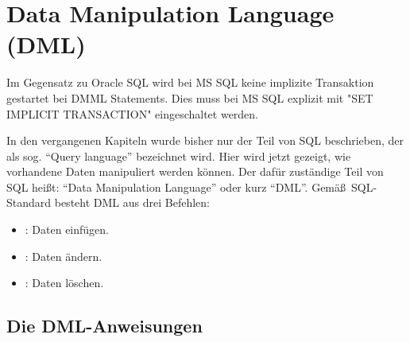 
  \chapter{Data Manipulation Language (DML)}
  \chaptertoc{}
  \cleardoubleevenpage
  \begin{merke}
    Im Gegensatz zu Oracle SQL wird bei MS SQL keine implizite Transaktion gestartet
    bei DMML Statements. Dies muss bei MS SQL explizit mit "SET IMPLICIT TRANSACTION" eingeschaltet werden.
  \end{merke}
      In den vergangenen Kapiteln wurde bisher nur der Teil von SQL beschrieben,
      der als sog. \enquote{Query language} bezeichnet wird. Hier wird jetzt
      gezeigt, wie vorhandene Daten manipuliert werden können. Der dafür
      zuständige Teil von SQL heißt: \enquote{Data Manipulation Language}
      oder kurz \enquote{DML}.
      Gemä\ss\ SQL-Standard besteht DML aus drei Befehlen:
      \begin{itemize}
        \item \INSERT: Daten einfügen.
        \item \UPDATE: Daten ändern.
        \item \DELETE: Daten löschen.
      \end{itemize}
    \section{Die DML-Anweisungen}
